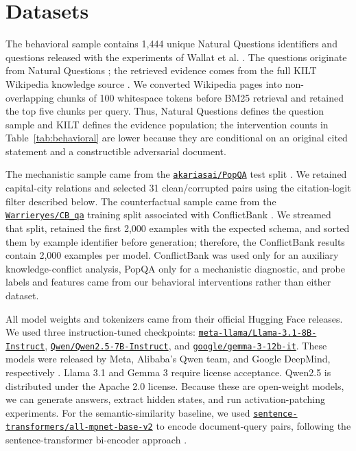 \documentclass[a4paper,fleqn]{cas-sc}
\begin{document}
\section{Datasets}
\label{sec:datasets}

\color{blue}
The behavioral sample contains 1,444 unique Natural Questions identifiers and questions released with the experiments of Wallat et al. \cite{wallat2025correctness}. The questions originate from Natural Questions \cite{kwiatkowski2019natural}; the retrieved evidence comes from the full KILT Wikipedia knowledge source \cite{petroni2021kilt}. We converted Wikipedia pages into non-overlapping chunks of 100 whitespace tokens before BM25 retrieval and retained the top five chunks per query. Thus, Natural Questions defines the question sample and KILT defines the evidence population; the intervention counts in Table~\ref{tab:behavioral} are lower because they are conditional on an original cited statement and a constructible adversarial document.
\color{black}

The mechanistic sample came from the \href{https://huggingface.co/datasets/akariasai/PopQA}{\texttt{akariasai/PopQA}} test split \cite{mallen2023popqa}. We retained capital-city relations and selected 31 clean/corrupted pairs using the citation-logit filter described below. The counterfactual sample came from the \href{https://huggingface.co/datasets/Warrieryes/CB_qa}{\texttt{Warrieryes/CB\_qa}} training split associated with ConflictBank \cite{su2024conflictbank}. We streamed that split, retained the first 2,000 examples with the expected schema, and sorted them by example identifier before generation; therefore, the ConflictBank results contain 2,000 examples per model. ConflictBank was used only for an auxiliary knowledge-conflict analysis, PopQA only for a mechanistic diagnostic, and probe labels and features came from our behavioral interventions rather than either dataset.

All model weights and tokenizers came from their official Hugging Face releases. We used three instruction-tuned checkpoints: \href{https://huggingface.co/meta-llama/Llama-3.1-8B-Instruct}{\texttt{meta-llama/Llama-3.1-8B-Instruct}}, \href{https://huggingface.co/Qwen/Qwen2.5-7B-Instruct}{\texttt{Qwen/Qwen2.5-7B-Instruct}}, and \href{https://huggingface.co/google/gemma-3-12b-it}{\texttt{google/gemma-3-12b-it}}. These models were released by Meta, Alibaba's Qwen team, and Google DeepMind, respectively \cite{grattafiori2024llama3,yang2024qwen25,gemmateam2025gemma3}. Llama 3.1 and Gemma 3 require license acceptance. Qwen2.5 is distributed under the Apache 2.0 license. Because these are open-weight models, we can generate answers, extract hidden states, and run activation-patching experiments. For the semantic-similarity baseline, we used \href{https://huggingface.co/sentence-transformers/all-mpnet-base-v2}{\texttt{sentence-transformers/all-mpnet-base-v2}} to encode document-query pairs, following the sentence-transformer bi-encoder approach \cite{reimers2019sentencebert}.
\end{document}
